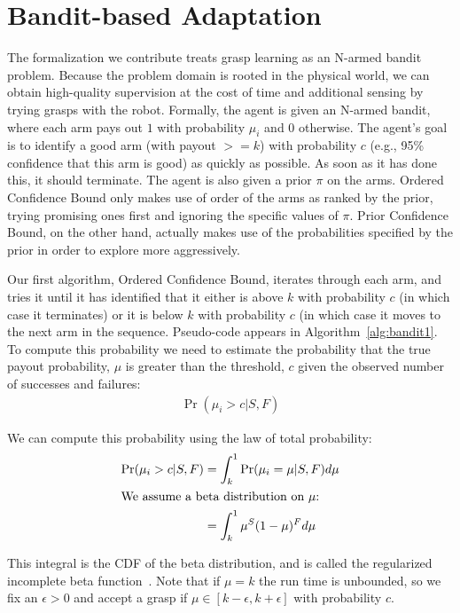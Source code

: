 \documentclass{article}
\newcommand{\algorithmCTxt}{Ordered Confidence Bound\xspace}
\newcommand{\algorithmDTxt}{Prior Confidence Bound\xspace}
\begin{document}
\section{Bandit-based Adaptation}

The formalization we contribute treats grasp learning as an N-armed bandit problem. Because
the problem domain is rooted in the physical world, we can obtain
high-quality supervision at the cost of time and additional sensing by
trying grasps with the robot. Formally, the agent is given an N-armed
bandit, where each arm pays out $1$ with probability $\mu_i$ and $0$
otherwise.  The agent's goal is to identify a good arm (with payout
$>= k$) with probability $c$ (e.g., 95\% confidence that this arm is
good) as quickly as possible.  As soon as it has done this, it should
terminate.  The agent is also given a prior $\pi$ on the
arms. \algorithmCTxt only makes use of order of the arms as ranked by
the prior, trying promising ones first and ignoring the specific
values of $\pi$. \algorithmDTxt, on the other hand, actually makes use
of the probabilities specified by the prior in order to explore more
aggressively.


Our first algorithm, \algorithmCTxt, iterates through each arm, and tries it
until it has identified that it either is above $k$ with probability
$c$ (in which case it terminates) or it is below $k$ with probability
$c$ (in which case it moves to the next arm in the sequence.
Pseudo-code appears in Algorithm~\ref{alg:bandit1}.  To compute this
probability we need to estimate the probability that the true payout
probability, $\mu$ is greater than the threshold, $c$ given the
observed number of successes and failures:
\begin{align}
\Pr(\mu_i > c|  S, F)
\end{align}

We can compute this probability using the law of total probability:
\begin{align}
\Pr(\mu_i > c|  S, F) &= \int_k^1 \Pr(\mu_i=\mu | S, F) d\mu\\
\intertext{We assume a beta distribution on $\mu$:}
                      &= \int_k^1 \mu^S (1- \mu) ^F d\mu
\end{align}

This integral is the CDF of the beta distribution, and is called the
regularized incomplete beta function~\citep{olver10}.  Note that if
$\mu = k$ the run time is unbounded, so we fix an $\epsilon > 0$ and
accept a grasp if $\mu \in [k-\epsilon, k+\epsilon]$ with probability
$c$.
\end{document}
